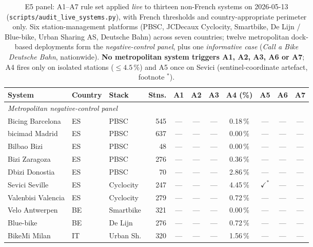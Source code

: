 \documentclass[11pt,a4paper]{article}
\begin{document}
\begin{table}[ht]
\centering
\caption{E5 panel: A1--A7 rule set applied \emph{live} to
thirteen non-French systems on 2026-05-13
(\texttt{scripts/audit\_live\_systems.py}), with French thresholds
and country-appropriate perimeter only. Six station-management
platforms (PBSC, JCDecaux Cyclocity, Smartbike, De Lijn /
Blue-bike, Urban Sharing AS, Deutsche Bahn) across seven
countries; twelve metropolitan dock-based deployments form the
\emph{negative-control panel}, plus one \emph{informative case}
(\emph{Call a Bike Deutsche Bahn}, nationwide).
\textbf{No metropolitan system triggers A1, A2, A3, A6 or A7};
A4 fires only on isolated stations ($\leq 4.5\,\%$) and A5 once
on Sevici (sentinel-coordinate artefact, footnote $^\ast$).}
\label{tab:e5-pilot}
\scriptsize
\setlength{\tabcolsep}{4pt}
\begin{tabular}{@{}lllr@{\hskip 6pt}ccccccc@{}}
\toprule
\textbf{System} & \textbf{Country} & \textbf{Stack} & \textbf{Stns.} & \textbf{A1} & \textbf{A2} & \textbf{A3} & \textbf{A4 (\%)} & \textbf{A5} & \textbf{A6} & \textbf{A7}\\
\midrule
\multicolumn{11}{l}{\emph{Metropolitan negative-control panel}}\\
Bicing Barcelona       & ES & PBSC      & 545  & --- & --- & --- & 0.18\,\% & --- & --- & --- \\
bicimad Madrid         & ES & PBSC      & 637  & --- & --- & --- & 0.00\,\% & --- & --- & --- \\
Bilbao Bizi            & ES & PBSC      & 48   & --- & --- & --- & 0.00\,\% & --- & --- & --- \\
Bizi Zaragoza          & ES & PBSC      & 276  & --- & --- & --- & 0.36\,\% & --- & --- & --- \\
Dbizi Donostia         & ES & PBSC      & 70   & --- & --- & --- & 2.86\,\% & --- & --- & --- \\
Sevici Seville         & ES & Cyclocity & 247  & --- & --- & --- & 4.45\,\% & $\checkmark^\ast$ & --- & --- \\
Valenbisi Valencia     & ES & Cyclocity & 279  & --- & --- & --- & 0.72\,\% & --- & --- & --- \\
Velo Antwerpen         & BE & Smartbike & 321  & --- & --- & --- & 0.00\,\% & --- & --- & --- \\
Blue-bike              & BE & De Lijn   & 276  & --- & --- & --- & 0.72\,\% & --- & --- & --- \\
BikeMi Milan           & IT & Urban Sh. & 320  & --- & --- & --- & 1.56\,\% & --- & --- & --- \\

\end{tabular}
\end{table}
\end{document}
